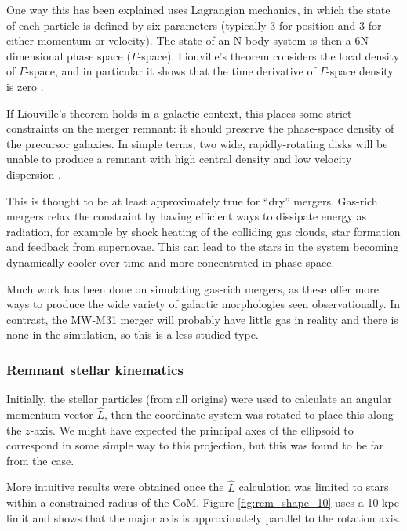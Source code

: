 \documentclass[twocolumn]{aastex63}
\begin{document}
One way this has been explained uses Lagrangian mechanics, in which the state of each particle is defined by six parameters (typically 3 for position and 3 for either momentum or velocity). The state of an N-body system is then a 6N-dimensional phase space ($\Gamma$-space). Liouville's theorem considers the local density of $\Gamma$-space, and in particular it shows that the time derivative of $\Gamma$-space density is zero \citep[Section 7.2.2]{binney_galactic_2008}. 

If Liouville's theorem holds in a galactic context, this places some strict constraints on the merger remnant: it should preserve the phase-space density of the precursor galaxies. In simple terms, two wide, rapidly-rotating disks will be unable to produce a remnant with high central density and low velocity dispersion \citep{carlberg_phase_1986}.

This is thought to be at least approximately true for ``dry'' mergers. Gas-rich mergers relax the constraint by having efficient ways to dissipate energy as radiation, for example by shock heating of the colliding gas clouds, star formation and feedback from supernovae. This can lead to the stars in the system becoming dynamically cooler over time and more concentrated in phase space.

Much work has been done on simulating gas-rich mergers, as these offer more ways to produce the wide variety of galactic morphologies seen observationally. In contrast, the MW-M31 merger will probably have little gas in reality and there is none in the simulation, so this is a less-studied type.

\subsubsection{Remnant stellar kinematics}
\label{sec:rem_st_kin}

Initially, the stellar particles (from all origins) were used to calculate an angular momentum vector $\hat{L}$, then the coordinate system was rotated to place this along the $z$-axis. We might have expected the principal axes of the ellipsoid to correspond in some simple way to this projection, but this was found to be far from the case.

More intuitive results were obtained once the $\hat{L}$ calculation was limited to stars within a constrained radius of the CoM.  Figure \ref{fig:rem_shape_10} uses a 10 kpc limit and shows that the major axis is approximately parallel to the rotation axis.
\end{document}
